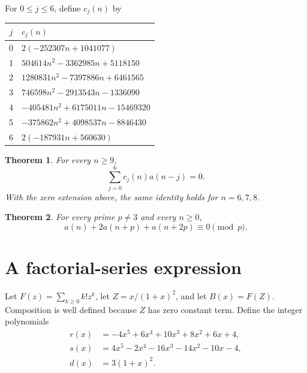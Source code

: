 \documentclass[11pt]{article}
\newtheorem{theorem}{Theorem}
\begin{document}
For $0\leq j\leq6$, define $c_j(n)$ by
\begin{center}
\begin{tabular}{cl}
\toprule
$j$ & $c_j(n)$\\
\midrule
0 & $2(-252307n+1041077)$\\
1 & $504614n^2-3362985n+5118150$\\
2 & $1280831n^2-7397886n+6461565$\\
3 & $746598n^2-2913543n-1336090$\\
4 & $-405481n^2+6175011n-15469320$\\
5 & $-375862n^2+4098537n-8846430$\\
6 & $2(-187931n+560630)$\\
\bottomrule
\end{tabular}
\end{center}

\begin{theorem}\label{thm:rec}
For every $n\geq9$,
\begin{equation}\label{eq:rec}
 \sum_{j=0}^{6}c_j(n)a(n-j)=0.
\end{equation}
With the zero extension above, the same identity holds for $n=6,7,8$.
\end{theorem}

\begin{theorem}\label{thm:cong}
For every prime $p\ne3$ and every $n\geq0$,
\begin{equation}\label{eq:cong}
 a(n)+2a(n+p)+a(n+2p)\equiv0\pmod p.
\end{equation}
\end{theorem}

\section{A factorial-series expression}
Let $F(z)=\sum_{k\geq0}k!z^k$, let
$Z=x/(1+x)^2$, and let $B(x)=F(Z)$.
Composition is well defined because $Z$ has zero constant term.
Define the integer polynomials
\begin{align*}
 r(x)&=-4x^5+6x^4+10x^3+8x^2+6x+4,\\
 s(x)&=4x^5-2x^4-16x^3-14x^2-10x-4,\\
 d(x)&=3(1+x)^2.
\end{align*}
\end{document}
